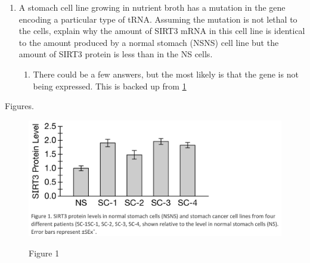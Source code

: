 \documentclass[11pt]{article}
\begin{document}
    \begin{enumerate}
        \item A stomach cell line growing in nutrient broth has a mutation in the gene encoding a particular
type of tRNA. Assuming the mutation is not lethal to the cells, explain why the amount
of SIRT3 mRNA in this cell line is identical to the amount produced by a normal stomach (NSNS)
cell line but the amount of SIRT3 protein is less than in the NS cells.
        \begin{enumerate}
            \item There could be a few answers, but the most likely is that the gene is not being expressed.
            This is backed up from \ref{Figure 1}
        \end{enumerate}
    \end{enumerate}

\newpage
    Figures.

    \begin{figure}
        \caption{Figure 1}
        \includegraphics{Long FRQ Fig. 1}
        \label{Figure 1}
    \end{figure}
\end{document}
